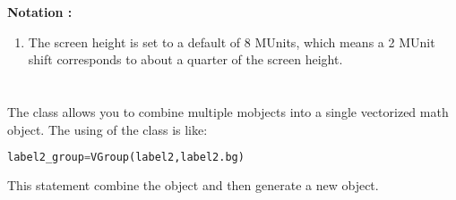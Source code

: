         \textbf{Notation :}
            \begin{enumerate}
                \item The screen height is set to a default of 8 MUnits, which means a 2 MUnit shift corresponds to about a quarter of the screen height.
            \end{enumerate}

\section{}
    \hspace*{2em}The  class allows you to combine multiple mobjects into a single vectorized math object. The using of the class is like:
        \begin{lstlisting}[language = {Python}, gobble = 12]
            label2_group=VGroup(label2,label2.bg)
        \end{lstlisting}
    This statement combine the object  and  then generate a new object.

